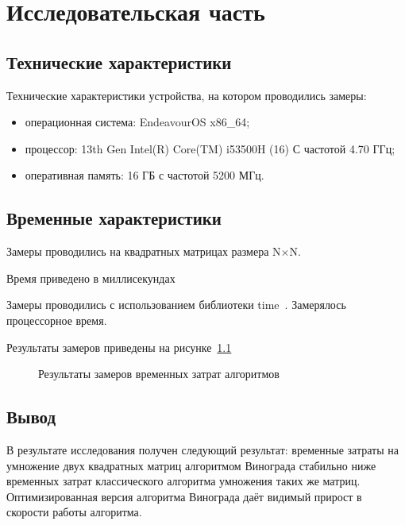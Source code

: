 \chapter{Исследовательская часть}

\section{Технические характеристики}

Технические характеристики устройства, на котором проводились замеры:

\begin{itemize}
	\item операционная система: EndeavourOS x86\_64;
	\item процессор: 13th Gen Intel(R) Core(TM) i53500H (16) С частотой 4.70 ГГц;
	\item оперативная память: 16 ГБ с частотой 5200 МГц.
\end{itemize}

\section{Временные характеристики}

Замеры проводились на квадратных матрицах размера N$\times$N.

Время приведено в миллисекундах

Замеры проводились с использованием библиотеки time~\cite{python3-time}. Замерялось процессорное время.

Результаты замеров приведены на рисунке~\ref{fig:profiling}

\begin{figure}[h!]

\caption{Результаты замеров временных затрат алгоритмов}
\label{fig:profiling}
\end{figure}

\section{Вывод}

В результате исследования получен следующий результат: временные затраты на умножение двух квадратных матриц алгоритмом Винограда стабильно ниже временных затрат классического алгоритма умножения таких же матриц. Оптимизированная версия алгоритма Винограда даёт видимый прирост в скорости работы алгоритма. 

\clearpage